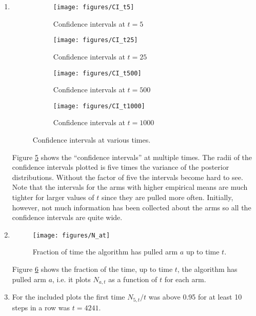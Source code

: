 \documentclass{article}
\begin{document}
\begin{enumerate}
	\item 
	\begin{figure}
		\centering
		\begin{subfigure}{0.49\textwidth}
			\centering
			\texttt{[image: figures/CI\_t5]}
			\caption{Confidence intervals at $t=5$} 
			\label{fig:CI_t5}
		\end{subfigure}
		\begin{subfigure}{0.49\textwidth}
			\centering
			\texttt{[image: figures/CI\_t25]}
			\caption{Confidence intervals at $t=25$} 
			\label{fig:CI_t25}
		\end{subfigure}
		\begin{subfigure}{0.49\textwidth}
			\centering
			\texttt{[image: figures/CI\_t500]}
			\caption{Confidence intervals at $t=500$} 
			\label{fig:CI_t500}
		\end{subfigure}
		\begin{subfigure}{0.49\textwidth}
			\centering
			\texttt{[image: figures/CI\_t1000]}
			\caption{Confidence intervals at $t=1000$} 
			\label{fig:CI_t1000}
		\end{subfigure}
		\caption{Confidence intervals at various times.}
		\label{fig:CIs}
	\end{figure}

	Figure \ref{fig:CIs} shows the ``confidence intervals'' at multiple times. The radii of the confidence intervals plotted is five times the variance of the posterior distributions. Without the factor of five the intervals become hard to see. Note that the intervals for the arms with higher empirical means are much tighter for larger values of $t$ since they are pulled more often. Initially, however, not much information has been collected about the arms so all the confidence intervals are quite wide.

	\item 
	\begin{figure}
		\centering
		\texttt{[image: figures/N\_at]}
		\caption{Fraction of time the algorithm has pulled arm $a$ up to time $t$.} 
		\label{fig:N_at}
	\end{figure}
	Figure \ref{fig:N_at} shows the fraction of the time, up to time $t$, the algorithm has pulled arm $a$, i.e. it plots $N_{a,t}$ as a function of $t$ for each arm.

	\item For the included plots the first time $N_{5,t}/t$ was above 0.95 for at least 10 steps in a row was $t=4241$.
\end{enumerate}
\end{document}
